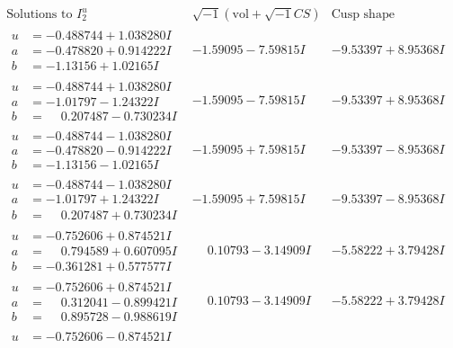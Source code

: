 \documentclass[1p]{elsarticle_modified}
\theoremstyle{definition}
\newcommand{\I}{\sqrt{-1}}
\begin{document}
$$\begin{array}{c|c|c}  
\text{Solutions to }I^u_{2}& \I (\text{vol} + \sqrt{-1}CS) & \text{Cusp shape}\\
 \hline 
\begin{aligned}
u &= -0.488744 + 1.038280 I \\
a &= -0.478820 + 0.914222 I \\
b &= -1.13156 + 1.02165 I\end{aligned}
 & -1.59095 - 7.59815 I & -9.53397 + 8.95368 I \\ \hline\begin{aligned}
u &= -0.488744 + 1.038280 I \\
a &= -1.01797 - 1.24322 I \\
b &= \phantom{-}0.207487 - 0.730234 I\end{aligned}
 & -1.59095 - 7.59815 I & -9.53397 + 8.95368 I \\ \hline\begin{aligned}
u &= -0.488744 - 1.038280 I \\
a &= -0.478820 - 0.914222 I \\
b &= -1.13156 - 1.02165 I\end{aligned}
 & -1.59095 + 7.59815 I & -9.53397 - 8.95368 I \\ \hline\begin{aligned}
u &= -0.488744 - 1.038280 I \\
a &= -1.01797 + 1.24322 I \\
b &= \phantom{-}0.207487 + 0.730234 I\end{aligned}
 & -1.59095 + 7.59815 I & -9.53397 - 8.95368 I \\ \hline\begin{aligned}
u &= -0.752606 + 0.874521 I \\
a &= \phantom{-}0.794589 + 0.607095 I \\
b &= -0.361281 + 0.577577 I\end{aligned}
 & \phantom{-}0.10793 - 3.14909 I & -5.58222 + 3.79428 I \\ \hline\begin{aligned}
u &= -0.752606 + 0.874521 I \\
a &= \phantom{-}0.312041 - 0.899421 I \\
b &= \phantom{-}0.895728 - 0.988619 I\end{aligned}
 & \phantom{-}0.10793 - 3.14909 I & -5.58222 + 3.79428 I \\ \hline\begin{aligned}
u &= -0.752606 - 0.874521 I \\

\end{aligned}
\end{array}$$
\end{document}
